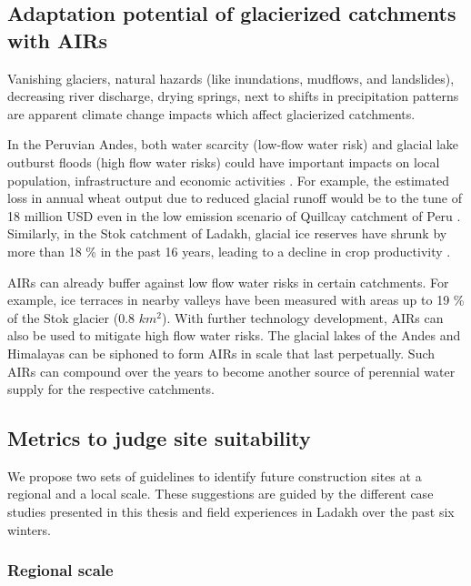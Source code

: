 \subsection{Adaptation potential of glacierized catchments with AIRs}

Vanishing glaciers, natural hazards (like inundations, mudflows, and landslides), decreasing river discharge,
drying springs, next to shifts in precipitation patterns are apparent climate change impacts which affect
glacierized catchments.

In the Peruvian Andes, both water scarcity (low-flow water risk) and glacial lake outburst floods (high flow
water risks) could have important impacts on local population, infrastructure and economic activities
\citep{motschmannIntegratedAssessmentsWater2020}. For example, the estimated loss in annual wheat output due to
reduced glacial runoff would be to the tune of 18 million USD even in the low emission scenario of Quillcay catchment
of Peru \citep{motschmannLossesDamagesConnected2020}. Similarly, in the Stok catchment of Ladakh, glacial ice
reserves have shrunk by more than 18 \% in the past 16 years, leading to a decline in crop productivity
\citep{sohebSpatiotemporalQuantificationKey2022}.

AIRs can already buffer against low flow water risks in certain catchments. For example, ice
terraces in nearby valleys have been measured with areas up to 19 \% of the Stok glacier (0.8 $km^2$). With further technology
development, AIRs can also be used to mitigate high flow water risks. The glacial lakes of the Andes and
Himalayas can be siphoned to form AIRs in scale that last perpetually. Such AIRs can compound over the years to
become another source of perennial water supply for the respective catchments.

\subsection{Metrics to judge site suitability}

We propose two sets of guidelines to identify future construction sites at a regional and a local scale. These
suggestions are guided by the different case studies presented in this thesis and field experiences in
Ladakh over the past six winters.

\subsubsection{Regional scale}

